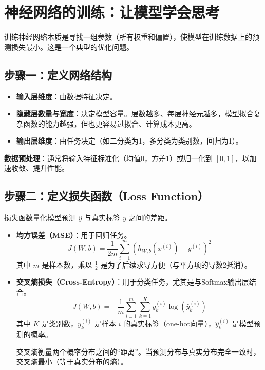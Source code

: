 \section{神经网络的训练：让模型学会思考}

训练神经网络本质是寻找一组参数（所有权重和偏置），使模型在训练数据上的预测损失最小。这是一个典型的优化问题。

\subsection{步骤一：定义网络结构}
\begin{itemize}
    \item \textbf{输入层维度}：由数据特征决定。
    \item \textbf{隐藏层数量与宽度}：决定模型容量。层数越多、每层神经元越多，模型拟合复杂函数的能力越强，但也更容易过拟合、计算成本更高。
    \item \textbf{输出层维度}：由任务决定（如二分类为1，多分类为类别数，回归为1）。
\end{itemize}
\textbf{数据预处理}：通常将输入特征标准化（均值0，方差1）或归一化到 $[0,1]$，以加速收敛、提升性能。

\subsection{步骤二：定义损失函数（Loss Function）}
损失函数量化模型预测 $\hat{y}$ 与真实标签 $y$ 之间的差距。
\begin{itemize}
    \item \textbf{均方误差（MSE）}：用于回归任务。
    \[
    J(W,b) = \frac{1}{2m} \sum_{i=1}^{m} (h_{W,b}(x^{(i)}) - y^{(i)})^2
    \]
    其中 $m$ 是样本数，乘以 $\frac{1}{2}$ 是为了后续求导方便（与平方项的导数2抵消）。
    \item \textbf{交叉熵损失（Cross-Entropy）}：用于分类任务，尤其是与Softmax输出层结合。
    \[
    J(W,b) = -\frac{1}{m} \sum_{i=1}^{m} \sum_{k=1}^{K} y_k^{(i)} \log(\hat{y}_k^{(i)})
    \]
    其中 $K$ 是类别数，$y_k^{(i)}$ 是样本 $i$ 的真实标签（one-hot向量），$\hat{y}_k^{(i)}$ 是模型预测的概率。
    \begin{remark}
        交叉熵衡量两个概率分布之间的“距离”。当预测分布与真实分布完全一致时，交叉熵最小（等于真实分布的熵）。
    \end{remark}
\end{itemize}


